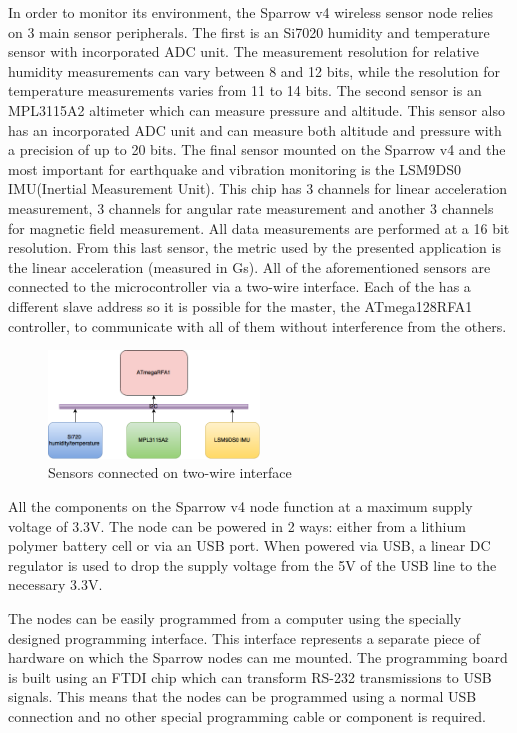 In order to monitor its environment, the Sparrow v4 wireless sensor node relies on 3 main sensor peripherals. The first is 
an Si7020 humidity and temperature sensor\cite{Si7020} with incorporated ADC unit. The measurement resolution for relative humidity measurements
can vary between 8 and 12 bits, while the resolution for temperature measurements varies from 11 to 14 bits. The second sensor is 
an MPL3115A2 \cite{MPL3115A2} altimeter which can measure pressure and altitude. This sensor also has an incorporated ADC unit and can measure 
both altitude and pressure with a precision of up to 20 bits. The final sensor mounted on the Sparrow v4 and the most important for 
earthquake and vibration monitoring is the LSM9DS0 IMU(Inertial Measurement Unit)\cite{LSM9DS0}. This chip has 3 channels for linear acceleration measurement, 
3 channels for angular rate measurement and another 3 channels for magnetic field measurement. All data measurements are performed at a 
16 bit resolution. From this last sensor, the metric used by the presented application is the linear acceleration (measured in Gs).
All of the aforementioned sensors are connected to the microcontroller via a two-wire interface. Each of the has a different slave address so 
it is possible for the master, the ATmega128RFA1 controller, to communicate with all of them without interference from the others.

\begin{figure}[ht] \centering
  \includegraphics[width=0.5\textwidth]{img/i2c-conn.png}
  \caption{Sensors connected on two-wire interface}
\end{figure}

All the components on the Sparrow v4 node function at a maximum supply voltage of 3.3V. The node can be powered in 2 ways: either from a lithium polymer battery 
cell or via an USB port. When powered via USB, a linear DC regulator is used to drop the supply voltage from the 5V of the USB line to the necessary 3.3V.

The nodes can be easily programmed from a computer using the specially designed programming interface. This interface represents a separate piece of hardware
on which the Sparrow nodes can me mounted. The programming board is built using an FTDI chip which can transform RS-232 transmissions to USB signals. This means 
that the nodes can be programmed using a normal USB connection and no other special programming cable or component is required.

